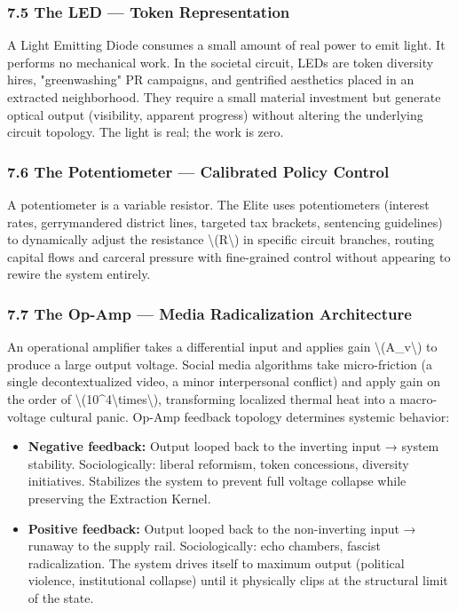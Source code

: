 {\subsubsection{7.5 The LED --- Token
Representation}\label{the-led-token-representation}

A Light Emitting Diode consumes a small amount of real power to emit
light. It performs no mechanical work. In the societal circuit, LEDs are
token diversity hires, "greenwashing" PR campaigns, and gentrified
aesthetics placed in an extracted neighborhood. They require a small
material investment but generate optical output (visibility, apparent
progress) without altering the underlying circuit topology. The light is
real; the work is zero.

\subsubsection{7.6 The Potentiometer --- Calibrated Policy
Control}\label{the-potentiometer-calibrated-policy-control}

A potentiometer is a variable resistor. The Elite uses potentiometers
(interest rates, gerrymandered district lines, targeted tax brackets,
sentencing guidelines) to dynamically adjust the resistance
\textbackslash(R\textbackslash) in specific circuit branches, routing
capital flows and carceral pressure with fine-grained control without
appearing to rewire the system entirely.

\subsubsection{7.7 The Op-Amp --- Media Radicalization
Architecture}\label{the-op-amp-media-radicalization-architecture}

An operational amplifier takes a differential input and applies gain
\textbackslash(A\_v\textbackslash) to produce a large output voltage.
Social media algorithms take micro-friction (a single decontextualized
video, a minor interpersonal conflict) and apply gain on the order of
\textbackslash(10\^{}4\textbackslash times\textbackslash), transforming
localized thermal heat into a macro-voltage cultural panic. Op-Amp
feedback topology determines systemic behavior:

\begin{itemize}
\tightlist
\item
  \textbf{Negative feedback:} Output looped back to the inverting input
  → system stability. Sociologically: liberal reformism, token
  concessions, diversity initiatives. Stabilizes the system to prevent
  full voltage collapse while preserving the Extraction Kernel.
\item
  \textbf{Positive feedback:} Output looped back to the non-inverting
  input → runaway to the supply rail. Sociologically: echo chambers,
  fascist radicalization. The system drives itself to maximum output
  (political violence, institutional collapse) until it physically clips
  at the structural limit of the state.
\end{itemize}

}
